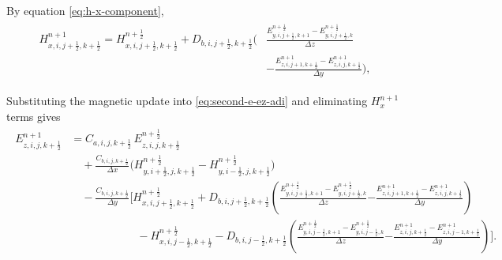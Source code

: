 \documentclass{article}
\numberwithin{equation}{section}
\numberwithin{figure}{section}
\begin{document}
By equation \eqref{eq:h-x-component},
\begin{align}
    \begin{split}
        H_{x,i,j+\tfrac12,k+\tfrac12}^{n+1} = H_{x,i,j+\tfrac12,k+\tfrac12}^{n+\frac12} + D_{b,i,j+\tfrac12,k+\tfrac12}\Big( & \frac{E_{y,i,j+\tfrac12,k+1}^{n+\frac12}-E_{y,i,j+\tfrac12,k}^{n+\frac12}}{\Delta z} \\
                                                                                                                             & - \frac{E_{z,i,j+1,k+\tfrac12}^{n+1}-E_{z,i,j,k+\tfrac12}^{n+1}}{\Delta y}\Big),
    \end{split}
\end{align}

Substituting the magnetic update into \eqref{eq:second-e-ez-adi} and eliminating $H_{x}^{n+1}$ terms gives
\begin{align}
    \begin{split}
        E_{z,i,j,k+\tfrac12}^{n+1} & = C_{a,i,j,k+\tfrac12}\,E_{z,i,j,k+\tfrac12}^{n+\frac12}                                                                                                                                                                                                                                                               \\
                                   & \quad + \frac{C_{b,i,j,k+\tfrac12}}{\Delta x}\Big(H_{y,i+\tfrac12,j,k+\tfrac12}^{n+\frac12}-H_{y,i-\tfrac12,j,k+\tfrac12}^{n+\frac12}\Big)                                                                                                                                                                             \\
                                   & \quad - \frac{C_{b,i,j,k+\tfrac12}}{\Delta y}\Bigg[H_{x,i,j+\tfrac12,k+\tfrac12}^{n+\frac12} + D_{b,i,j+\tfrac12,k+\tfrac12}\left(\frac{E_{y,i,j+\tfrac12,k+1}^{n+\frac12}-E_{y,i,j+\tfrac12,k}^{n+\frac12}}{\Delta z}\right. \left. - \frac{E_{z,i,j+1,k+\tfrac12}^{n+1}-E_{z,i,j,k+\tfrac12}^{n+1}}{\Delta y}\right) \\
                                   & \qquad\qquad\qquad - H_{x,i,j-\tfrac12,k+\tfrac12}^{n+\frac12} - D_{b,i,j-\tfrac12,k+\tfrac12}\left(\frac{E_{y,i,j-\tfrac12,k+1}^{n+\frac12}-E_{y,i,j-\tfrac12,k}^{n+\frac12}}{\Delta z}\right. \left. - \frac{E_{z,i,j,k+\tfrac12}^{n+1}-E_{z,i,j-1,k+\tfrac12}^{n+1}}{\Delta y}\right)\Bigg].
    \end{split}
\end{align}
\end{document}
